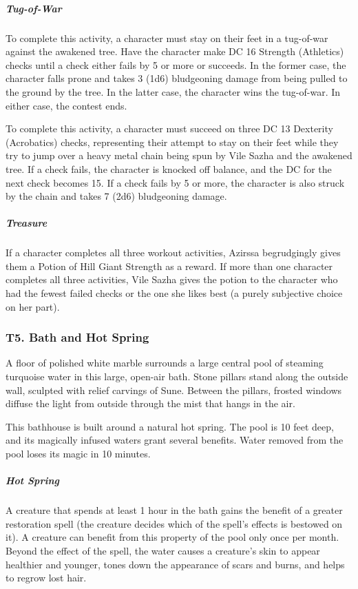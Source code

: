 \documentclass[10pt,a4paper,twoside,bg=print,twocolumn,openany,nodeprecatedcode]{dndbook}
\begin{document}
\subparagraph{Tug-of-War}
To complete this activity, a character must stay on their feet in a tug-of-war against the awakened tree. Have the character make DC 16 Strength (Athletics) checks until a check either fails by 5 or more or succeeds. In the former case, the character falls prone and takes 3 (1d6) bludgeoning damage from being pulled to the ground by the tree. In the latter case, the character wins the tug-of-war. In either case, the contest ends.


\begin{description}[nolistsep]
\item[Chain Skipping]
To complete this activity, a character must succeed on three DC 13 Dexterity (Acrobatics) checks, representing their attempt to stay on their feet while they try to jump over a heavy metal chain being spun by Vile Sazha and the awakened tree. If a check fails, the character is knocked off balance, and the DC for the next check becomes 15. If a check fails by 5 or more, the character is also struck by the chain and takes 7 (2d6) bludgeoning damage.
\end{description}

\subparagraph{Treasure}
If a character completes all three workout activities, Azirssa begrudgingly gives them a Potion of Hill Giant Strength as a reward. If more than one character completes all three activities, Vile Sazha gives the potion to the character who had the fewest failed checks or the one she likes best (a purely subjective choice on her part).

\subsubsection{T5. Bath and Hot Spring}
\begin{DndReadAloud}{}
A floor of polished white marble surrounds a large central pool of steaming turquoise water in this large, open-air bath. Stone pillars stand along the outside wall, sculpted with relief carvings of Sune. Between the pillars, frosted windows diffuse the light from outside through the mist that hangs in the air.

\end{DndReadAloud}

This bathhouse is built around a natural hot spring. The pool is 10 feet deep, and its magically infused waters grant several benefits. Water removed from the pool loses its magic in 10 minutes.

\subparagraph{Hot Spring}
A creature that spends at least 1 hour in the bath gains the benefit of a greater restoration spell (the creature decides which of the spell's effects is bestowed on it). A creature can benefit from this property of the pool only once per month. Beyond the effect of the spell, the water causes a creature's skin to appear healthier and younger, tones down the appearance of scars and burns, and helps to regrow lost hair.
\end{document}
